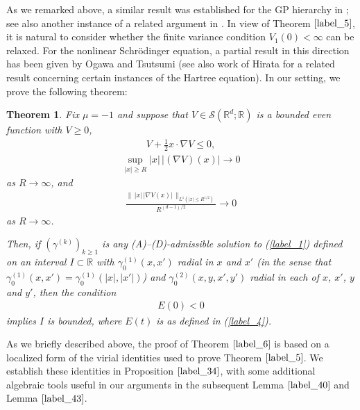 \documentclass[reqno]{amsart}
\numberwithin{equation}{section}
\newtheorem{theorem}{Theorem}[section]
\theoremstyle{remark}
\begin{document}
As we remarked above, a similar result was established for the GP hierarchy in \cite{CPT}; see also another instance of a related argument in \cite{CHPS2}.  In view of Theorem $\ref{label_5}$, it is natural to consider whether the finite variance condition $V_1(0)<\infty$ can be relaxed.  For the nonlinear Schr\"odinger equation, a partial result in this direction has been given by Ogawa and Tsutsumi \cite{OT} (see also work of Hirata \cite{H} for a related result concerning certain instances of the Hartree equation).  In our setting, we prove the following theorem:
\begin{theorem}
\label{label_6}
Fix $\mu=-1$ and suppose that $V\in\mathcal{S}(\mathbb{R}^d;\mathbb{R})$ is a bounded even function with $V\geq 0$, 
\begin{align}
V+\frac{1}{2}x\cdot \nabla V\leq 0,\label{label_7}
\end{align}
\begin{align}
\label{label_8}\sup_{|x|\geq R}|x|\,|(\nabla V)(x)|\rightarrow 0
\end{align}
as $R\rightarrow\infty$, and
\begin{align}
\label{label_9} \frac{\lVert\, |x|\, |\nabla V(x)|\, \rVert_{L^1(|x|\leq R^{1/2})}}{R^{(d-1)/2}}\rightarrow 0
\end{align}
as $R\rightarrow\infty$.

Then, if $(\gamma^{(k)})_{k\geq 1}$ is any (A)--(D)-admissible solution to (\ref{label_1}) defined on an interval $I\subset\mathbb{R}$ with $\gamma_0^{(1)}(x,x')$ radial in $x$ and $x'$ (in the sense that $\gamma_0^{(1)}(x,x')=\gamma_0^{(1)}(|x|,|x'|)$) and $\gamma_0^{(2)}(x,y,x',y')$ radial in each of $x$, $x'$, $y$ and $y'$, then the condition 
\begin{align*}
E(0)<0
\end{align*}
implies $I$ is bounded, where $E(t)$ is as defined in (\ref{label_4}).
\end{theorem}

As we briefly described above, the proof of Theorem $\ref{label_6}$ is based on a localized form of the virial identities used to prove Theorem $\ref{label_5}$.  We establish these identities in Proposition $\ref{label_34}$, with some additional algebraic tools useful in our arguments in the subsequent Lemma $\ref{label_40}$ and Lemma $\ref{label_43}$.  
\end{document}
